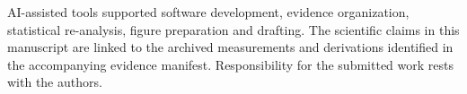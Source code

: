 \documentclass[manuscript,screen,review]{acmart}
\begin{document}







\begin{acks}
AI-assisted tools supported software development, evidence organization, statistical re-analysis, figure preparation and drafting. The scientific claims in this manuscript are linked to the archived measurements and derivations identified in the accompanying evidence manifest. Responsibility for the submitted work rests with the authors.
\end{acks}





\end{document}
